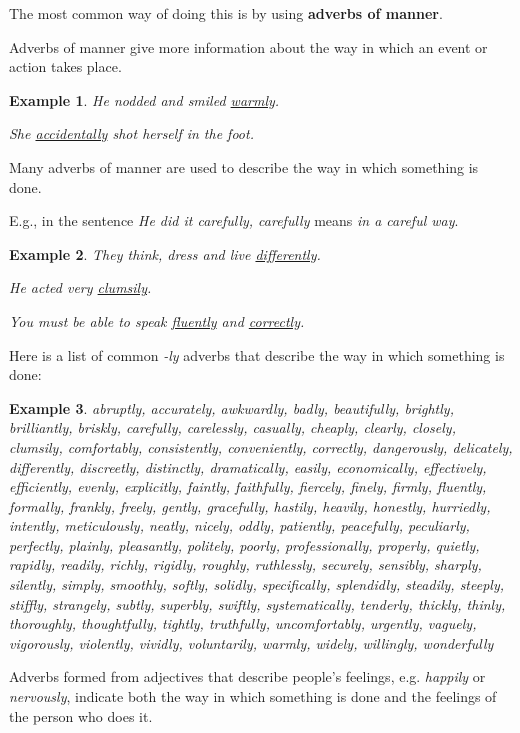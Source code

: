 \documentclass[oneside]{book}
\numberwithin{equation}{section}
\newtheorem{example}{Example}[section]
\begin{document}
The most common way of doing this is by using \textbf{adverbs of manner}.

Adverbs of manner give more information about the way in which an event or action takes place.
\begin{example}
    He nodded and smiled \underline{warmly}.
    
    She \underline{accidentally} shot herself in the foot.
\end{example}
%
\noindent{} Many adverbs of manner are used to describe the way in which something is done.

E.g., in the sentence \textit{He did it carefully, carefully} means \textit{in a careful way}.
\begin{example}
    They think, dress and live \underline{differently}.
    
    He acted very \underline{clumsily}.
    
    You must be able to speak \underline{fluently} and \underline{correctly}.
\end{example}
%
\noindent{} Here is a list of common \textit{-ly} adverbs that describe the way in which something is done:
\begin{example}
    abruptly, accurately, awkwardly, badly, beautifully, brightly, brilliantly, briskly, carefully, carelessly, casually, cheaply, clearly, closely, clumsily, comfortably, consistently, conveniently, correctly, dangerously, delicately, differently, discreetly, distinctly, dramatically, easily, economically, effectively, efficiently, evenly, explicitly, faintly, faithfully, fiercely, finely, firmly, fluently, formally, frankly, freely, gently, gracefully, hastily, heavily, honestly, hurriedly, intently, meticulously, neatly, nicely, oddly, patiently, peacefully, peculiarly, perfectly, plainly, pleasantly, politely, poorly, professionally, properly, quietly, rapidly, readily, richly, rigidly, roughly, ruthlessly, securely, sensibly, sharply, silently, simply, smoothly, softly, solidly, specifically, splendidly, steadily, steeply, stiffly, strangely, subtly, superbly, swiftly, systematically, tenderly, thickly, thinly, thoroughly, thoughtfully, tightly, truthfully, uncomfortably, urgently, vaguely, vigorously, violently, vividly, voluntarily, warmly, widely, willingly, wonderfully
\end{example}
%
\noindent{} Adverbs formed from adjectives that describe people's feelings, e.g. \textit{happily} or \textit{nervously}, indicate both the way in which something is done and the feelings of the person who does it.
\end{document}

